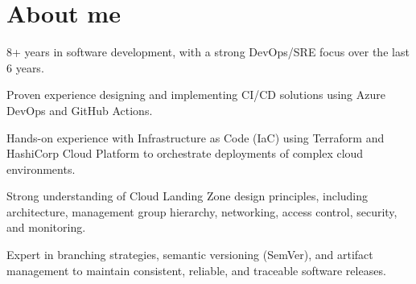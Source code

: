 \documentclass[11pt]{deedy-resume-openfont}
\begin{document}
    
%
%
{}
%
%
\vspace{0.8cm}
\section{About me}
\vspace{2pt}
\begin{tightemize}
	\item 8+ years in software development, with a strong DevOps/SRE focus over the last 6 years.
	\item Proven experience designing and implementing CI/CD solutions using Azure DevOps and GitHub Actions.
	\item Hands-on experience with Infrastructure as Code (IaC) using Terraform and HashiCorp Cloud Platform to orchestrate deployments of complex cloud environments.
	\item Strong understanding of Cloud Landing Zone design principles, including architecture, management group hierarchy, networking, access control, security, and monitoring.
	\item Expert in branching strategies, semantic versioning (SemVer), and artifact management to maintain consistent, reliable, and traceable software releases.
\end{tightemize}
%
%
\vspace{0.8cm}
\end{document}
